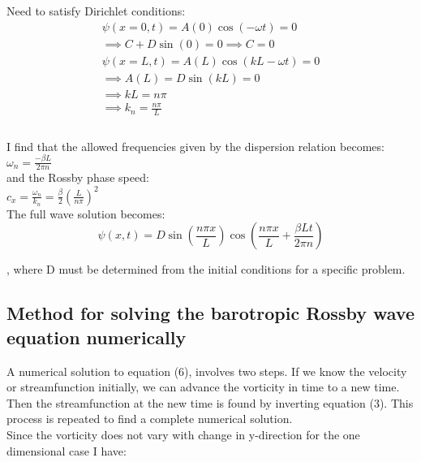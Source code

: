 Need to satisfy Dirichlet conditions:\\

\begin{equation}
\begin{gathered}
\psi(x=0,t) = A(0)\cos(-\omega t) = 0\\
\implies C + D\sin(0) = 0
\implies C = 0\\
\psi(x=L,t) = A(L)\cos(kL-\omega t) = 0\\
\implies A(L) = D\sin(kL) = 0\\
\implies kL = n\pi\\
\implies k_n = \frac{n\pi}{L}\\
\end{gathered}
\end{equation}\\

I find that the allowed frequencies given by the dispersion relation becomes:\\

$\omega_n = \frac{-\beta L}{2\pi n}$\\

and the Rossby phase speed:\\

$c_x = \frac{\omega_n}{k_n} = \frac{\beta}{2}(\frac{L}{n\pi})^2$\\

The full wave solution becomes:\\

\begin{equation}
\psi(x,t) = D\sin(\frac{n\pi x}{L})\cos(\frac{n\pi x}{L}+\frac{\beta Lt}{2\pi n})
\end{equation}

, where D must be determined from the initial conditions for a specific problem.




\subsection{Method for solving the barotropic Rossby wave equation numerically}
A numerical solution to equation (6), involves two steps. If we know the velocity or streamfunction initially, we can advance the vorticity in time to a new time. Then the streamfunction at the new time is found by inverting equation (3). This process is repeated to find a complete numerical solution.\\

Since the vorticity does not vary with change in y-direction for the one dimensional case I have:\\

